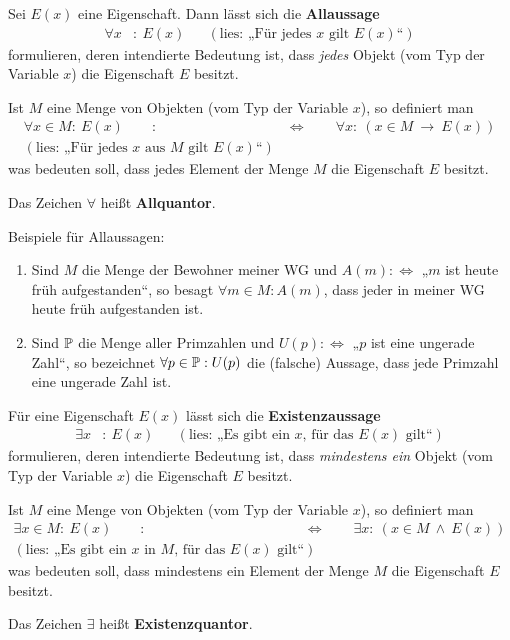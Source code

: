 \begin{defin}[Allaussage] \label{def:allquant}
    Sei $E(x)$ eine Eigenschaft. Dann lässt sich die \textbf{Allaussage}
    \begin{align*}
        \forall x &:\  E(x) && (\text{lies: „Für jedes $x$ gilt $E(x)$“})
    \end{align*}
    formulieren, deren intendierte Bedeutung ist, dass \emph{jedes} Objekt (vom Typ der Variable $x$) die Eigenschaft $E$ besitzt.
    
    Ist $M$ eine Menge von Objekten (vom Typ der Variable $x$), so definiert man
    \begin{align*}
        \forall x\in M:\ E(x) \qquad :& \Leftrightarrow\qquad \forall x:\ (x\in M\ \to\ E(x))  \\
        (\text{lies: „Für jedes $x$ aus $M$ gilt $E(x)$“}) &
    \end{align*}
    was bedeuten soll, dass jedes Element der Menge $M$ die Eigenschaft $E$ besitzt.
    
    Das Zeichen $\forall$ heißt \textbf{Allquantor}.
\end{defin}


\begin{bsp}
    Beispiele für Allaussagen:
    \begin{enumerate}
        \item Sind $M$ die Menge der Bewohner meiner WG und $A(m):\Leftrightarrow$ „$m$ ist heute früh aufgestanden“, so besagt $\forall m\in M: A(m)$, dass jeder in meiner WG heute früh aufgestanden ist.
        \item Sind $\mathbb P$ die Menge aller Primzahlen und $U(p):\Leftrightarrow$ „$p$ ist eine ungerade Zahl“, so bezeichnet $\forall p\in\mathbb P : U(p)$ die (falsche) Aussage, dass jede Primzahl eine ungerade Zahl ist.
    \end{enumerate}
\end{bsp}


\begin{defin}[Existenzaussage]\label{def:existquant}
    Für eine Eigenschaft $E(x)$ lässt sich die \textbf{Existenzaussage}
    \begin{align*}
        \exists x &:\ E(x) && (\text{lies: „Es gibt ein $x$, für das $E(x)$ gilt“})
    \end{align*}
    formulieren, deren intendierte Bedeutung ist, dass \emph{mindestens ein} Objekt (vom Typ der Variable $x$) die Eigenschaft $E$ besitzt.
    
    Ist $M$ eine Menge von Objekten (vom Typ der Variable $x$), so definiert man
    \begin{align*}
        \exists x\in M:\ E(x) \qquad :& \Leftrightarrow\qquad \exists x:\ (x\in M\ \land\ E(x))  \\
        (\text{lies: „Es gibt ein $x$ in $M$, für das $E(x)$ gilt“}) &
    \end{align*}
    was bedeuten soll, dass mindestens ein Element der Menge $M$ die Eigenschaft $E$ besitzt.
    
    Das Zeichen $\exists$ heißt \textbf{Existenzquantor}.
\end{defin}
    

